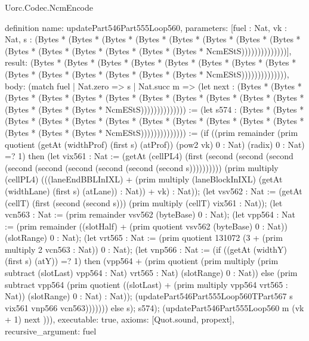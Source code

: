 \begin{lexlean}{Uorc.Codec.NcmEncode}
\begin{semanticmodule}
definition{
  name: updatePart546Part555Loop560,
  parameters: [fuel : Nat, vk : Nat, s : (Bytes * (Bytes * (Bytes * (Bytes * (Bytes * (Bytes * (Bytes * (Bytes * (Bytes * (Bytes * (Bytes * (Bytes * (Bytes * (Bytes * NcmEStS))))))))))))))],
  result: (Bytes * (Bytes * (Bytes * (Bytes * (Bytes * (Bytes * (Bytes * (Bytes * (Bytes * (Bytes * (Bytes * (Bytes * (Bytes * (Bytes * NcmEStS)))))))))))))),
  body: (match fuel
    | Nat.zero => s
    | Nat.succ m => (let next : (Bytes * (Bytes * (Bytes * (Bytes * (Bytes * (Bytes * (Bytes * (Bytes * (Bytes * (Bytes * (Bytes * (Bytes * (Bytes * (Bytes * NcmEStS)))))))))))))) := (let s574 : (Bytes * (Bytes * (Bytes * (Bytes * (Bytes * (Bytes * (Bytes * (Bytes * (Bytes * (Bytes * (Bytes * (Bytes * (Bytes * (Bytes * NcmEStS)))))))))))))) := (if ((prim remainder (prim quotient (getAt (widthProf) (first s) (atProf)) (pow2 vk) 0 : Nat) (radix) 0 : Nat) =? 1) then (let vix561 : Nat := (getAt (cellPL4) (first (second (second (second (second (second (second (second (second (second s)))))))))) (prim multiply (cellPL4) (((laneEndBBLInIXL) + (prim multiply (laneBlockInIXL) (getAt (widthLane) (first s) (atLane)) : Nat)) + vk) : Nat)); (let vsv562 : Nat := (getAt (cellT) (first (second (second s))) (prim multiply (cellT) vix561 : Nat)); (let vcn563 : Nat := (prim remainder vsv562 (byteBase) 0 : Nat); (let vpp564 : Nat := (prim remainder ((slotHalf) + (prim quotient vsv562 (byteBase) 0 : Nat)) (slotRange) 0 : Nat); (let vrt565 : Nat := (prim quotient 131072 (3 + (prim multiply 2 vcn563 : Nat)) 0 : Nat); (let vnp566 : Nat := (if ((getAt (widthY) (first s) (atY)) =? 1) then (vpp564 + (prim quotient (prim multiply (prim subtract (slotLast) vpp564 : Nat) vrt565 : Nat) (slotRange) 0 : Nat)) else (prim subtract vpp564 (prim quotient ((slotLast) + (prim multiply vpp564 vrt565 : Nat)) (slotRange) 0 : Nat) : Nat)); (updatePart546Part555Loop560TPart567 s vix561 vnp566 vcn563))))))) else s); s574); (updatePart546Part555Loop560 m (vk + 1) next ))),
  executable: true,
  axioms: [Quot.sound, propext],
  recursive_argument: fuel
}


\end{semanticmodule}
\end{lexlean}
